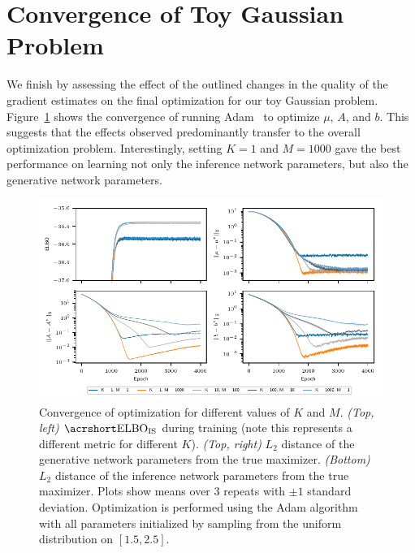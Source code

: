 
\section{Convergence of Toy Gaussian Problem}
\label{sec:app:toy-Gauss}

We finish by assessing the effect of the outlined changes in the quality
of the gradient estimates on the final optimization for our toy Gaussian problem.  Figure~\ref{fig:snr/hd_gaussian}
shows the convergence of running Adam~\citep{kingma2014adam} to optimize $\mu$, $A$, 
and $b$.  This suggests that the effects observed predominantly transfer to the overall
optimization problem.  Interestingly, setting $K=1$ and $M=1000$ gave the best performance
on learning not only the inference network parameters, but also the generative network
parameters.
\begin{figure}[h]
	\includegraphics[width=\textwidth]{figures/tighter_bounds/hd_gaussian.pdf}
	\caption{Convergence of optimization for different values of $K$ and $M$. 
		\emph{(Top, left)} $\ELBO_{\text{IS}}$ during training
		(note this represents a different metric for different $K$). \emph{(Top, right)} $L_2$ distance of the generative network parameters from the true maximizer. \emph{(Bottom)} $L_2$ distance of the inference network parameters from the true maximizer. Plots show means over $3$ repeats with $\pm 1$ standard deviation. Optimization is performed using the Adam algorithm with all parameters initialized by sampling from the uniform distribution on $[1.5, 2.5]$.}
	\label{fig:snr/hd_gaussian}
\end{figure}